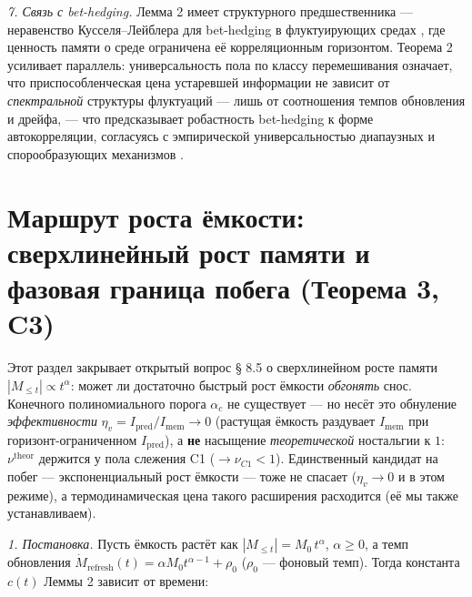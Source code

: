 \documentclass[12pt]{iopart}
\begin{document}
\emph{7. Связь с bet-hedging.} Лемма 2 имеет структурного предшественника --- неравенство Кусселя--Лейблера для bet-hedging в флуктуирующих средах \cite{KussellLeibler2005}, где ценность памяти о среде ограничена её корреляционным горизонтом. Теорема 2 усиливает параллель: универсальность пола по классу перемешивания означает, что приспособленческая цена устаревшей информации не зависит от \emph{спектральной} структуры флуктуаций --- лишь от соотношения темпов обновления и дрейфа, --- что предсказывает робастность bet-hedging к форме автокорреляции, согласуясь с эмпирической универсальностью диапаузных и спорообразующих механизмов \cite{DecaesteckerDaphnia2007,ErringtonSporulation2003}.



\section{Маршрут роста ёмкости: сверхлинейный рост памяти и фазовая граница побега (Теорема 3, C3)}\label{ux43cux430ux440ux448ux440ux443ux442-ux440ux43eux441ux442ux430-ux451ux43cux43aux43eux441ux442ux438-ux441ux432ux435ux440ux445ux43bux438ux43dux435ux439ux43dux44bux439-ux440ux43eux441ux442-ux43fux430ux43cux44fux442ux438-ux438-ux444ux430ux437ux43eux432ux430ux44f-ux433ux440ux430ux43dux438ux446ux430-ux43fux43eux431ux435ux433ux430-ux442ux435ux43eux440ux435ux43cux430-3-c3}



Этот раздел закрывает открытый вопрос § 8.5 \cite{Andriishin2026b} о сверхлинейном росте памяти \(|M_{\le t}| \propto t^\alpha\): может ли достаточно быстрый рост ёмкости \emph{обгонять} снос. Конечного полиномиального порога \(\alpha_c\) не существует --- но несёт это обнуление \emph{эффективности} \(\eta_v = I_{\text{pred}}/I_{\text{mem}} \to 0\) (растущая ёмкость раздувает \(I_{\text{mem}}\) при горизонт-ограниченном \(I_{\text{pred}}\)), а \textbf{не} насыщение \emph{теоретической} ностальгии к \(1\): \(\nu^{\text{theor}}\) держится у пола слежения C1 (\(\to \nu_{C1} < 1\)). Единственный кандидат на побег --- экспоненциальный рост ёмкости --- тоже не спасает (\(\eta_v \to 0\) и в этом режиме), а термодинамическая цена такого расширения расходится (её мы также устанавливаем).



\emph{1. Постановка.} Пусть ёмкость растёт как \(|M_{\le t}| = M_0\,t^\alpha\), \(\alpha \ge 0\), а темп обновления \(\dot M_{\text{refresh}}(t) = \alpha M_0 t^{\alpha-1} + \rho_0\) (\(\rho_0\) --- фоновый темп). Тогда константа \(c(t)\) Леммы 2 зависит от времени:
\end{document}
